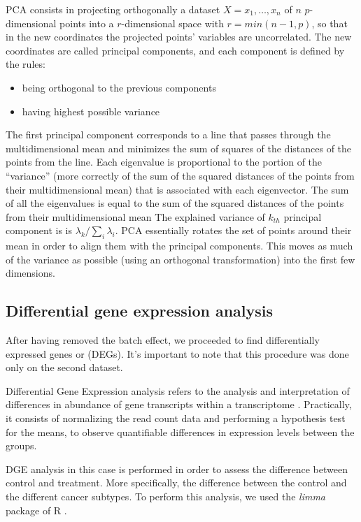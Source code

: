 \documentclass[journal]{IEEEtran}
\begin{document}
PCA consists in projecting orthogonally a dataset $X = x_1 , \dots , x_n$ of $n$ $p$-dimensional points into a $r$-dimensional space with $r = min(n-1,p)$, so that in the new coordinates the projected points’ variables are uncorrelated.
The new coordinates are called principal components, and each component is defined by the rules:
\begin{itemize}
    \item being orthogonal to the previous components 
    \item having highest possible variance
\end{itemize}

The first principal component corresponds to a line that passes through the multidimensional mean and minimizes the sum of squares of the distances of the points from the line. Each eigenvalue is proportional to the portion of the “variance” (more correctly of the sum of the squared distances of the points from their multidimensional mean) that is associated with each eigenvector.
The sum of all the eigenvalues is equal to the sum of the squared distances of the points from their multidimensional mean The explained variance of $k_{th}$ principal component is is $\lambda_k / \sum_i \lambda_i$. PCA essentially rotates the set of points around their mean in order to align them with the principal components. This moves as much of the variance as possible (using an orthogonal transformation) into the first few dimensions.

\subsection{Differential gene expression analysis}
After having removed the batch effect, we proceeded to find differentially expressed genes or (DEGs). It's important to note that this procedure was done only on the second dataset.

Differential Gene Expression analysis refers to the analysis and interpretation of differences in abundance of gene transcripts within a transcriptome \cite{CHEN2019324}. Practically, it consists of normalizing the read count data and performing a hypothesis test for the means, to observe quantifiable differences in expression levels between the groups.

DGE analysis in this case is performed in order to assess the difference between control and treatment. More specifically, the difference between the control and the different cancer subtypes.
To perform this analysis, we used the \textit{limma} package of R \cite{Ritchie2015}.
\end{document}
